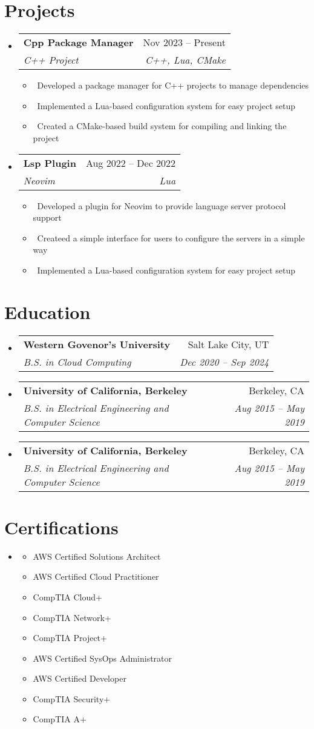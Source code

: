 \documentclass[letterpaper,10pt]{article}
\makeatletter
\newcommand{\resumeItem}[1]{\item\small{#1}}
\newcommand{\resumeSubheading}[4]{
\vspace{-1pt}\item
  \begin{tabular*}{0.97\textwidth}[t]{l@{\extracolsep{\fill}}r}
    \textbf{#1} & #2 \\
    \textit{#3} & \textit{#4} \\
  \end{tabular*}\vspace{-7pt}
}
\newcommand{\resumeSubHeadingList}{\begin{itemize}[leftmargin=0.15in, label={}]}
\newcommand{\resumeSubHeadingListEnd}{\end{itemize}}
\makeatother
\begin{document}
\section{Projects}
\resumeSubHeadingList
  \resumeSubheading
      {Cpp Package Manager}{Nov 2023 -- Present}
      {C++ Project}{C++, Lua, CMake}
      \resumeSubHeadingList
          \resumeItem{\textbullet\ Developed a package manager for C++ projects to manage dependencies}
          \resumeItem{\textbullet\ Implemented a Lua-based configuration system for easy project setup}
          \resumeItem{\textbullet\ Created a CMake-based build system for compiling and linking the project}
      \resumeSubHeadingListEnd
  \resumeSubheading
      {Lsp Plugin}{Aug 2022 -- Dec 2022} 
      {Neovim}{Lua}
      \resumeSubHeadingList
          \resumeItem{\textbullet\ Developed a plugin for Neovim to provide language server protocol support}
          \resumeItem{\textbullet\ Createed a simple interface for users to configure the servers in a simple way}
          \resumeItem{\textbullet\ Implemented a Lua-based configuration system for easy project setup}
      \resumeSubHeadingListEnd
\resumeSubHeadingListEnd

\section{Education}
\resumeSubHeadingList
  \resumeSubheading
      {Western Govenor's University}{Salt Lake City, UT}
      {B.S. in Cloud Computing}{Dec 2020 -- Sep 2024}
  \resumeSubheading
      {University of California, Berkeley}{Berkeley, CA}
      {B.S. in Electrical Engineering and Computer Science}{Aug 2015 -- May 2019}
  \resumeSubheading
      {University of California, Berkeley}{Berkeley, CA}
      {B.S. in Electrical Engineering and Computer Science}{Aug 2015 -- May 2019}

\resumeSubHeadingListEnd

\section{Certifications}
\resumeSubHeadingList
  \resumeItem{
  \begin{multicols}{2}
  \begin{itemize}[leftmargin=*]
    \item AWS Certified Solutions Architect
    \item AWS Certified Cloud Practitioner
    \item CompTIA Cloud+
    \item CompTIA Network+
    \item CompTIA Project+
  \end{itemize}
  \columnbreak
  \begin{itemize}[leftmargin=*]
    \item AWS Certified SysOps Administrator
    \item AWS Certified Developer
    \item CompTIA Security+
    \item CompTIA A+
  \end{itemize}
  \end{multicols}}
\resumeSubHeadingListEnd
\end{document}
